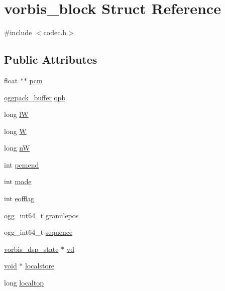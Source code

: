 \hypertarget{structvorbis__block}{}\section{vorbis\+\_\+block Struct Reference}
\label{structvorbis__block}


{\ttfamily \#include $<$codec.\+h$>$}

\subsection*{Public Attributes}
\begin{DoxyCompactItemize}
\item 
float $\ast$$\ast$ \hyperlink{structvorbis__block_ac8312d70a6e63afc01d3df8a54ac6508}{pcm}
\item 
\hyperlink{structoggpack__buffer}{oggpack\+\_\+buffer} \hyperlink{structvorbis__block_a43f1746974a729fa4e835ef995f9782a}{opb}
\item 
long \hyperlink{structvorbis__block_a97675088561ed9aa4559e869aafd1f2c}{lW}
\item 
long \hyperlink{structvorbis__block_a1e420440dd6a5a39262c0fe7afa8435a}{W}
\item 
long \hyperlink{structvorbis__block_a6fa002c8c36ad39c1c015cfa673dda28}{nW}
\item 
int \hyperlink{structvorbis__block_a946562a7fdb80cabf6ee749bdce1a0ed}{pcmend}
\item 
int \hyperlink{structvorbis__block_adab44bb8520c9d5daafee3f1a1bcf538}{mode}
\item 
int \hyperlink{structvorbis__block_a7bc1252bc17a2cd1ee2a4154fdd2617b}{eofflag}
\item 
ogg\+\_\+int64\+\_\+t \hyperlink{structvorbis__block_a3dc7d5e474ae80ea641df91eba16b490}{granulepos}
\item 
ogg\+\_\+int64\+\_\+t \hyperlink{structvorbis__block_a09e48c70ae79cae2d37a4e0e55f294ef}{sequence}
\item 
\hyperlink{structvorbis__dsp__state}{vorbis\+\_\+dsp\+\_\+state} $\ast$ \hyperlink{structvorbis__block_adefe79be61ef3631c18cd7b8afae31a2}{vd}
\item 
\hyperlink{_s_d_l__opengles2__gl2ext_8h_ae5d8fa23ad07c48bb609509eae494c95}{void} $\ast$ \hyperlink{structvorbis__block_a457093b574de4317ae1b2505a868a5fb}{localstore}
\item 
long \hyperlink{structvorbis__block_a5d207139360d9fa6c825ebca553ae984}{localtop}
\item 
$$
\end{DoxyCompactItemize}
